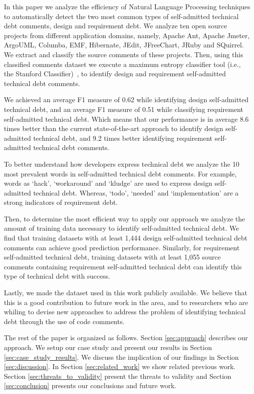 \documentclass{sig-alternate}
\newcommand{\SATD}{self-admitted technical debt\xspace}
\begin{document}
In this paper we analyze the efficiency of Natural Language Processing techniques to automatically detect the two most common types of \SATD comments, design and requirement debt. We analyze ten open source projects from different application domains, namely, Apache Ant, Apache Jmeter, ArgoUML, Columba, EMF, Hibernate, JEdit, JFreeChart, JRuby and SQuirrel. We extract and classify the source comments of these projects. Then, using this classified comments dataset we execute a maximum entropy classifier tool (i.e., the Stanford Classifier)~\cite{Manning2014ACL}, to identify design and requirement \SATD comments.

We achieved an average F1 measure of 0.62 while identifying design \SATD, and an average F1 measure of 0.51 while classifying requirement \SATD. Which means that our performance is in average 8.6 times better than the current state-of-the-art approach to identify design \SATD, and 9.2 times better identifying requirement \SATD comments.

To better understand how developers express technical debt we analyze the 10 most prevalent words in \SATD comments. For example, words as `hack', `workaround' and `kludge' are used to express design \SATD. Whereas, `todo', `needed' and `implementation' are a strong indicators of requirement debt.

Then, to determine the most efficient way to apply our approach we analyze the amount of training data necessary to identify \SATD. We find that training datasets with at least 1,444 design \SATD comments can achieve good prediction performance. Similarly, for requirement \SATD, training datasets with at least 1,055 source comments containing requirement \SATD can identify this type of technical debt with success.  

Lastly, we made the dataset used in this work publicly available. We believe that this is a good contribution to future work in the area, and to researchers who are whiling to devise new approaches to address the problem of identifying technical debt through the use of code comments.

The rest of the paper is organized as follows. Section \ref{sec:approach} describes our approach. We setup our case study and present our
results in Section \ref{sec:case_study_results}. We discuss the implication of our findings in Section \ref{sec:discussion}. In Section \ref{sec:related_work} we show related previous work. Section \ref{sec:threats_to_validity} present the threats to validity and Section \ref{sec:conclusion} presents our conclusions and future work.  
\end{document}
